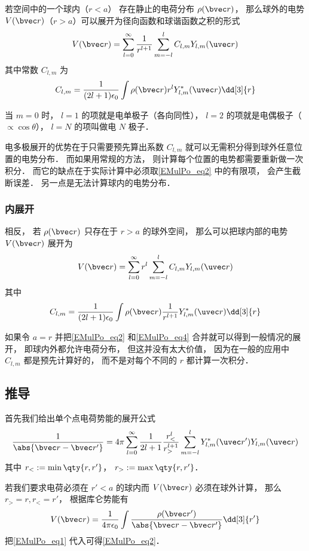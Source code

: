 

若空间中的一个球内（$r < a$） 存在静止的电荷分布 $\rho(\bvec r)$， 那么球外的电势 $V(\bvec r)$（$r > a$）可以展开为径向函数和球谐函数之积的形式
\begin{equation}\label{EMulPo_eq2}
V(\bvec r) = \sum_{l = 0}^\infty \frac{1}{r^{l+1}}\sum_{m = -l}^l C_{l,m} Y_{l,m}(\uvec r)
\end{equation}
其中常数 $C_{l,m}$ 为
\begin{equation}
C_{l,m} = \frac{1}{(2l+1)\epsilon_0} \int \rho(\bvec r) r^l Y_{l,m}^*(\uvec r) \dd[3]{r}
\end{equation}

当 $m = 0$ 时， $l = 1$ 的项就是电单极子（各向同性）， $l = 2$ 的项就是电偶极子（$\propto\cos \theta$）， $l = N$ 的项叫做电 $N$ 极子．

电多极展开的优势在于只需要预先算出系数 $C_{l,m}$ 就可以无需积分得到球外任意位置的电势分布． 而如果用常规的方法， 则计算每个位置的电势都需要重新做一次积分． 而它的缺点在于实际计算中必须取\autoref{EMulPo_eq2} 中的有限项， 会产生截断误差． 另一点是无法计算球内的电势分布．

\subsubsection{内展开}
相反， 若 $\rho(\bvec r)$ 只存在于 $r > a$ 的球外空间， 那么可以把球内部的电势 $V(\bvec r)$ 展开为
\begin{equation}\label{EMulPo_eq4}
V(\bvec r) = \sum_{l = 0}^\infty r^l \sum_{m = -l}^l C_{l,m} Y_{l,m}(\uvec r)
\end{equation}
其中
\begin{equation}\label{EMulPo_eq3}
C_{l,m} = \frac{1}{(2l+1)\epsilon_0} \int \rho(\bvec r) \frac{1}{r^{l+1}} Y_{l,m}^*(\uvec r) \dd[3]{r}
\end{equation}

如果令 $a = r$ 并把\autoref{EMulPo_eq2} 和\autoref{EMulPo_eq4} 合并就可以得到一般情况的展开， 即球内外都允许电荷分布， 但这并没有太大价值， 因为在一般的应用中 $C_{l,m}$ 都是预先计算好的， 而不是对每个不同的 $r$ 都计算一次积分．

\subsection{推导}
首先我们给出单个点电荷势能的展开公式
\begin{equation}\label{EMulPo_eq1}
\frac{1}{\abs{\bvec r - \bvec r'}} = 4\pi \sum_{l=0}^{\infty} \frac{1}{2l+1} \frac{r_<^l}{r_>^{l+1}} \sum_{m = -l}^l Y_{l,m}^*(\uvec r') Y_{l,m}(\uvec r)
\end{equation}
其中 $r_< := \min\qty{r, r'}$， $r_> := \max\qty{r, r'}$．

若我们要求电荷必须在 $r' < a$ 的球内而 $V(\bvec r)$ 必须在球外计算， 那么 $r_> = r, r_< = r'$， 根据库仑势能有
\begin{equation}
V(\bvec r) = \frac{1}{4\pi\epsilon_0}\int \frac{\rho(\bvec r')}{\abs{\bvec r - \bvec r'}} \dd[3]{r'}
\end{equation}
把\autoref{EMulPo_eq1} 代入可得\autoref{EMulPo_eq2}．
